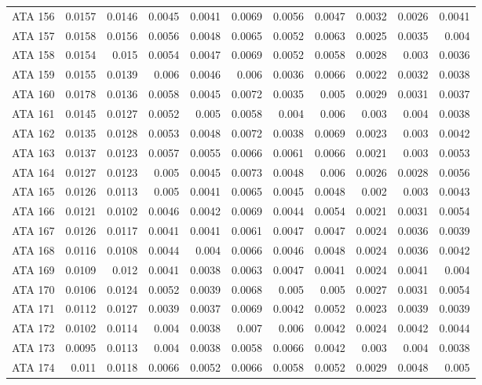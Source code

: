 \begin{landscape}
\begin{longtable}{rrrrrrrrrrr}
  ATA 156 & 0.0157 & 0.0146 & 0.0045 & 0.0041 & 0.0069 & 0.0056 & 0.0047 & 0.0032 & 0.0026 & 0.0041 \\ 
  ATA 157 & 0.0158 & 0.0156 & 0.0056 & 0.0048 & 0.0065 & 0.0052 & 0.0063 & 0.0025 & 0.0035 & 0.004 \\ 
  ATA 158 & 0.0154 & 0.015 & 0.0054 & 0.0047 & 0.0069 & 0.0052 & 0.0058 & 0.0028 & 0.003 & 0.0036 \\ 
  ATA 159 & 0.0155 & 0.0139 & 0.006 & 0.0046 & 0.006 & 0.0036 & 0.0066 & 0.0022 & 0.0032 & 0.0038 \\ 
  ATA 160 & 0.0178 & 0.0136 & 0.0058 & 0.0045 & 0.0072 & 0.0035 & 0.005 & 0.0029 & 0.0031 & 0.0037 \\ 
  ATA 161 & 0.0145 & 0.0127 & 0.0052 & 0.005 & 0.0058 & 0.004 & 0.006 & 0.003 & 0.004 & 0.0038 \\ 
  ATA 162 & 0.0135 & 0.0128 & 0.0053 & 0.0048 & 0.0072 & 0.0038 & 0.0069 & 0.0023 & 0.003 & 0.0042 \\ 
  ATA 163 & 0.0137 & 0.0123 & 0.0057 & 0.0055 & 0.0066 & 0.0061 & 0.0066 & 0.0021 & 0.003 & 0.0053 \\ 
  ATA 164 & 0.0127 & 0.0123 & 0.005 & 0.0045 & 0.0073 & 0.0048 & 0.006 & 0.0026 & 0.0028 & 0.0056 \\ 
  ATA 165 & 0.0126 & 0.0113 & 0.005 & 0.0041 & 0.0065 & 0.0045 & 0.0048 & 0.002 & 0.003 & 0.0043 \\ 
  ATA 166 & 0.0121 & 0.0102 & 0.0046 & 0.0042 & 0.0069 & 0.0044 & 0.0054 & 0.0021 & 0.0031 & 0.0054 \\ 
  ATA 167 & 0.0126 & 0.0117 & 0.0041 & 0.0041 & 0.0061 & 0.0047 & 0.0047 & 0.0024 & 0.0036 & 0.0039 \\ 
  ATA 168 & 0.0116 & 0.0108 & 0.0044 & 0.004 & 0.0066 & 0.0046 & 0.0048 & 0.0024 & 0.0036 & 0.0042 \\ 
  ATA 169 & 0.0109 & 0.012 & 0.0041 & 0.0038 & 0.0063 & 0.0047 & 0.0041 & 0.0024 & 0.0041 & 0.004 \\ 
  ATA 170 & 0.0106 & 0.0124 & 0.0052 & 0.0039 & 0.0068 & 0.005 & 0.005 & 0.0027 & 0.0031 & 0.0054 \\ 
  ATA 171 & 0.0112 & 0.0127 & 0.0039 & 0.0037 & 0.0069 & 0.0042 & 0.0052 & 0.0023 & 0.0039 & 0.0039 \\ 
  ATA 172 & 0.0102 & 0.0114 & 0.004 & 0.0038 & 0.007 & 0.006 & 0.0042 & 0.0024 & 0.0042 & 0.0044 \\ 
  ATA 173 & 0.0095 & 0.0113 & 0.004 & 0.0038 & 0.0058 & 0.0066 & 0.0042 & 0.003 & 0.004 & 0.0038 \\ 
  ATA 174 & 0.011 & 0.0118 & 0.0066 & 0.0052 & 0.0066 & 0.0058 & 0.0052 & 0.0029 & 0.0048 & 0.005 \\ 

\end{longtable}
\end{landscape}
